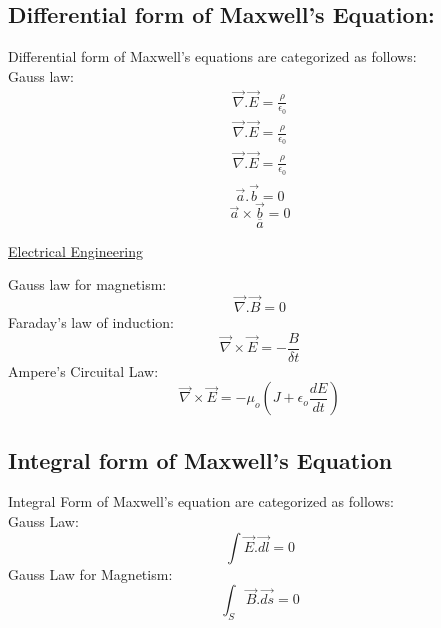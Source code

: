 \documentclass[12 pt,a4paper]{report}
\begin{document}
\subsection{Differential form of Maxwell's Equation:}
Differential form of Maxwell's equations are categorized as follows:\\
Gauss law:
\begin{eqnarray*}
\overset{\rightarrow}{\nabla}.\overset{\rightarrow}{E}=\frac{\rho}{\epsilon_{0}}\\
\overset{\rightarrow}{\nabla}.\overset{\rightarrow}{E}=\frac{\rho}{\epsilon_{0}}\\
\overset{\rightarrow}{\nabla}.\overset{\rightarrow}{E}=\frac{\rho}{\epsilon_{0}}\\
\end{eqnarray*}
$$\overset{\rightarrow}{a}.\overset{\rightarrow}{b}=0$$
$$\overset{\rightarrow}{a}\times\overset{\rightarrow}{b}=0$$
$$\overline{a}$$
\begin{center}
\underline{Electrical Engineering}
\end{center}

Gauss law for magnetism:
$$\overset{\rightarrow}{\nabla}.\overset{\rightarrow}{B}=0$$
Faraday's law of induction:
$$\overset{\rightarrow}{\nabla}\times\overset{\rightarrow}{E}=-\frac{B}{\delta t}$$
Ampere's Circuital Law:
$$\overset{\rightarrow}{\nabla}\times\overset{\rightarrow}{E}=-\mu_{o}(J+\epsilon_{o}\frac{dE}{dt})$$
\subsection{Integral form of Maxwell's Equation}
Integral Form of Maxwell's equation are categorized as follows:\\
Gauss Law:\\
$$\int\overset{\rightarrow}{E}.\overset{\rightarrow}{dl}=0$$ 
Gauss Law for Magnetism:\\
$$\int_{S}\overset{\rightarrow}{B}.\overset{\rightarrow}{ds}=0$$
\end{document}
